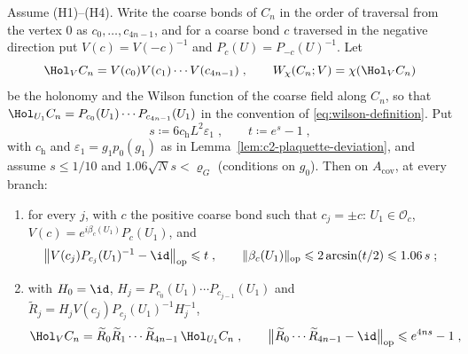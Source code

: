 
\begin{proposition}\label{prop:coarse-loop-form}
Assume (H1)--(H4). Write the coarse bonds of $C_n$ in the order of traversal from the vertex $0$ as $c_0,\ldots,c_{4n-1}$, and for a coarse bond $c$ traversed in the negative direction put $V(c)= V(-c)^{-1}$ and $P_c(U)= P_{-c}(U)^{-1}$. Let
\begin{equation*}
    \Hol_VC_n= V(c_0)V(c_1)\cdots V(c_{4n-1})\;,\qquad W_{\chi}(C_n;V)=\chi(\Hol_VC_n)
\end{equation*}
be the holonomy and the Wilson function of the coarse field along $C_n$, so that $\Hol_{U_1}C_n= P_{c_0}(U_1)\cdots P_{c_{4n-1}}(U_1)$ in the convention of \eqref{eq:wilson-definition}. Put
\begin{equation*}
    s\coloneqq 6c_{\mathrm h}L^2\varepsilon_1\;,\qquad t\coloneqq e^{s}-1\;,
\end{equation*}
with $c_{\mathrm h}$ and $\varepsilon_1= g_1p_0(g_1)$ as in Lemma~\ref{lem:c2-plaquette-deviation}, and assume $s\leqslant 1/10$ and $1.06\sqrt N s<\varrho_G$ (conditions on $g_0$). Then on $A_{\mathrm{cov}}$, at every branch:
\begin{enumerate}[label=(\roman*)]
    \item for every $j$, with $c$ the positive coarse bond such that $c_j=\pm c$: $U_1\in\mathcal O_c$, $V(c)= e^{i\beta_c(U_1)}P_c(U_1)$, and
    \begin{equation}\label{eq:coarse-loop-insertions}
        \bigl\|V(c_j)P_{c_j}(U_1)^{-1}-\id\bigr\|_{\mathrm{op}}\leqslant t\;,\qquad \|\beta_c(U_1)\|_{\mathrm{op}}\leqslant 2\arcsin(t/2)\leqslant 1.06\,s\;;
    \end{equation}
    \item with $H_0=\id$, $H_j= P_{c_0}(U_1)\cdots P_{c_{j-1}}(U_1)$ and $\widetilde R_j= H_jV(c_j)P_{c_j}(U_1)^{-1}H_j^{-1}$,
    \begin{equation}\label{eq:coarse-loop-identity}
        \Hol_VC_n=\widetilde R_0\widetilde R_1\cdots\widetilde R_{4n-1}\,\Hol_{U_1}C_n\;,\qquad \bigl\|\widetilde R_0\cdots\widetilde R_{4n-1}-\id\bigr\|_{\mathrm{op}}\leqslant e^{4ns}-1\;,

\end{equation}
\end{enumerate}
\end{proposition}
